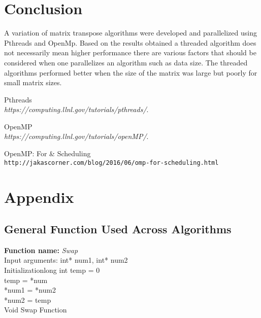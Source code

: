 \documentclass[10pt,journal]{article}
\begin{document}
\section{Conclusion}

A variation of matrix transpose algorithms were developed and parallelized using Pthreads and OpenMp. Based on the results obtained a threaded algorithm does not necessarily mean higher performance there are various factors that should be considered when one parallelizes an algorithm such as data size. The 
threaded algorithms performed better when the size of the matrix was large but poorly for small matrix sizes.

\justify

\newpage
\begin{thebibliography}{9}
Pthreads
\\\textit{https://computing.llnl.gov/tutorials/pthreads/}. 

 
OpenMP
\\\textit{https://computing.llnl.gov/tutorials/openMP/}. 

 
OpenMP: For & Scheduling
\\\texttt{http://jakascorner.com/blog/2016/06/omp-for-scheduling.html}
\end{thebibliography}

\appendix
\newpage
\section{Appendix}
\subsection{General Function Used Across Algorithms}
\begin{algorithm}[H]
\SetAlgoLined
\textbf{Function name:} \emph{Swap}\\\vspace{10pt}
Input arguments:\: int* num1, int* num2\\

Initialization\:long int temp = 0\\
     temp = *num\\
    *num1 = *num2\\
    *num2 = temp\\

\caption{Void Swap Function}
\end{algorithm}
\end{document}
